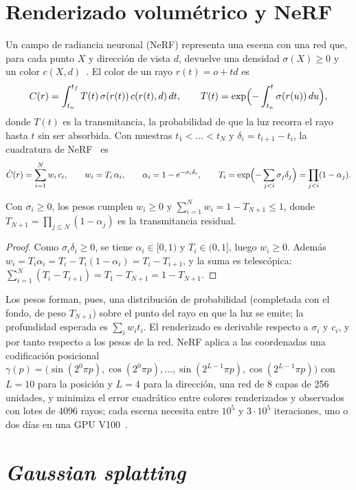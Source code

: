\section{Renderizado volumétrico y NeRF}

Un campo de radiancia neuronal (NeRF) representa una escena con una red que, para cada punto $X$ y dirección de vista $d$, devuelve una densidad $\sigma(X)\ge 0$ y un color $c(X,d)$~\cite{nerf}. El color de un rayo $r(t)=o+td$ es
\[
C(r)=\int_{t_n}^{t_f}T(t)\,\sigma(r(t))\,c(r(t),d)\,dt,\qquad T(t)=\exp\Bigl(-\int_{t_n}^{t}\sigma(r(u))\,du\Bigr),
\]
donde $T(t)$ es la transmitancia, la probabilidad de que la luz recorra el rayo hasta $t$ sin ser absorbida. Con muestras $t_1<\dots<t_N$ y $\delta_i=t_{i+1}-t_i$, la cuadratura de NeRF~\cite[§4]{nerf} es
\[
\hat C(r)=\sum_{i=1}^N w_i\,c_i,\qquad w_i=T_i\,\alpha_i,\qquad \alpha_i=1-e^{-\sigma_i\delta_i},\qquad T_i=\exp\Bigl(-\sum_{j<i}\sigma_j\delta_j\Bigr)=\prod_{j<i}(1-\alpha_j).
\]

\begin{proposicion}\label{prop:pesos}
Con $\sigma_i\ge 0$, los pesos cumplen $w_i\ge 0$ y $\sum_{i=1}^Nw_i=1-T_{N+1}\le 1$, donde $T_{N+1}=\prod_{j\le N}(1-\alpha_j)$ es la transmitancia residual.
\end{proposicion}

\begin{proof}
Como $\sigma_i\delta_i\ge 0$, se tiene $\alpha_i\in[0,1)$ y $T_i\in(0,1]$, luego $w_i\ge 0$. Además $w_i=T_i\alpha_i=T_i-T_i(1-\alpha_i)=T_i-T_{i+1}$, y la suma es telescópica: $\sum_{i=1}^N(T_i-T_{i+1})=T_1-T_{N+1}=1-T_{N+1}$.
\end{proof}

Los pesos forman, pues, una distribución de probabilidad (completada con el fondo, de peso $T_{N+1}$) sobre el punto del rayo en que la luz se emite; la profundidad esperada es $\sum_iw_it_i$. El renderizado es derivable respecto a $\sigma_i$ y $c_i$, y por tanto respecto a los pesos de la red. NeRF aplica a las coordenadas una codificación posicional $\gamma(p)=\bigl(\sin(2^0\pi p),\cos(2^0\pi p),\dots,\sin(2^{L-1}\pi p),\cos(2^{L-1}\pi p)\bigr)$ con $L=10$ para la posición y $L=4$ para la dirección, una red de 8 capas de 256 unidades, y minimiza el error cuadrático entre colores renderizados y observados con lotes de 4096 rayos; cada escena necesita entre $10^5$ y $3\cdot 10^5$ iteraciones, uno o dos días en una GPU V100~\cite[§5]{nerf}.

\section{\emph{Gaussian splatting}}

